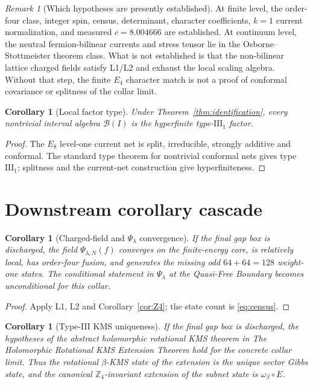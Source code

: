 \documentclass[11pt]{article}
\newtheorem{corollary}[theorem]{Corollary}
\theoremstyle{remark}
\newtheorem{remark}[theorem]{Remark}
\newcommand{\B}{\mathcal B}
\newcommand{\Z}{\mathbb Z}
\begin{document}
\begin{remark}[Which hypotheses are presently established]
At finite level, the order-four class, integer spin, census, determinant,
character coefficients, $k=1$ current normalization, and measured
$c=8.004666$ are established.  At continuum level, the neutral
fermion-bilinear currents and stress tensor lie in the
Osborne--Stottmeister theorem class.  What is not established is that the
non-bilinear lattice charged fields satisfy L1/L2 and exhaust the local
scaling algebra.  Without that step, the finite $E_4$ character match is
not a proof of conformal covariance or splitness of the collar limit.
\end{remark}

\begin{corollary}[Local factor type]\label{cor:typeIII}
Under Theorem~\ref{thm:identification}, every nontrivial interval algebra
$\B(I)$ is the hyperfinite type-$\mathrm{III}_1$ factor.
\end{corollary}

\begin{proof}
The $E_8$ level-one current net is split, irreducible, strongly additive
and conformal.  The standard type theorem for nontrivial conformal nets
gives type $\mathrm{III}_1$; splitness and the current-net construction
give hyperfiniteness.
\end{proof}

\section{Downstream corollary cascade}

\begin{corollary}[Charged-field and $\Psi_\lambda$ convergence]
If the final gap box is discharged, the field
$\Psi_{\lambda,N}(f)$ converges on the finite-energy core, is relatively
local, has order-four fusion, and generates the missing odd
$64+64=128$ weight-one states.  The conditional statement in
\emph{$\Psi_\lambda$ at the Quasi-Free Boundary} becomes unconditional
for this collar.
\end{corollary}

\begin{proof}
Apply L1, L2 and Corollary~\ref{cor:Z4}; the state count is
\eqref{eq:census}.
\end{proof}

\begin{corollary}[Type-III KMS uniqueness]
If the final gap box is discharged, the hypotheses of the abstract
holomorphic rotational KMS theorem in
\emph{The Holomorphic Rotational KMS Extension Theorem} hold for the
concrete collar limit.  Thus the rotational $\beta$-KMS state of the
extension is the unique sector Gibbs state, and the canonical
$\Z_4$-invariant extension of the subnet state is
$\omega_\beta\circ E$.
\end{corollary}
\end{document}
